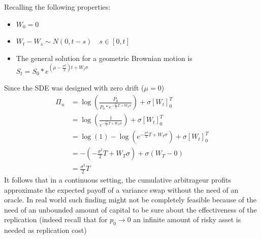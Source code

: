\documentclass[12pt]{article}
\begin{document}
Recalling the following properties:
\begin{itemize}
    \item $W_0=0$
    \item $W_t-W_s \sim N(0,t-s) \quad s\in[0,t]$
    \item The general solution for a geometric Brownian motion is $S_t = S_0*e^{(\mu-\frac{\sigma^2}{2})t +W_t\sigma}$
\end{itemize}
Since the SDE was designed with zero drift ($\mu=0$)
\begin{align*}
    \Pi_n & =\log\left(\frac{P_0}{P_0*e^{-\frac{\sigma^2}{2}T +W_T\sigma}}\right) + \sigma[W_t]^T_0 \\
          & =\log\left(\frac{1}{e^{-\frac{\sigma^2}{2}T +W_T\sigma}}\right) + \sigma[W_t]^T_0       \\
          & =\log(1)-\log\left(e^{-\frac{\sigma^2}{2}T +W_T\sigma}\right) + \sigma[W_t]^T_0         \\
          & =-\left(-\frac{\sigma^2}{2}T +W_T\sigma\right) + \sigma(W_T-0)                          \\
          & = \frac{\sigma^2}{2}T
\end{align*}
It follows that in a continuous setting, the cumulative arbitrageur profits approximate the expected payoff of a variance swap without the need of an oracle. In real world such finding might not be completely feasible because of the need of an unbounded amount of capital \textbf{}to be sure about the effectiveness of the replication (indeed recall that for $p_0\rightarrow 0$ an infinite amount of risky asset is needed as replication cost)
\end{document}
